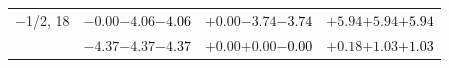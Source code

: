 \documentclass[compress]{beamer}
\begin{document}
\begin{frame}
\begin{tabular}{r | c | c | c}
$-$1/2, 18 & $-0.00$\hspace{0.1 cm}$-4.06$\hspace{0.1 cm}\textcolor{black}{$-4.06$} & $+0.00$\hspace{0.1 cm}$-3.74$\hspace{0.1 cm}\textcolor{black}{$-3.74$} & $+5.94$\hspace{0.1 cm}$+5.94$\hspace{0.1 cm}\textcolor{black}{$+5.94$} \\
           & $-4.37$\hspace{0.1 cm}$-4.37$\hspace{0.1 cm}\textcolor{black}{$-4.37$} & $+0.00$\hspace{0.1 cm}$+0.00$\hspace{0.1 cm}\textcolor{black}{$-0.00$} & $+0.18$\hspace{0.1 cm}$+1.03$\hspace{0.1 cm}\textcolor{black}{$+1.03$} \\
\end{tabular}
\end{frame}
\end{document}
